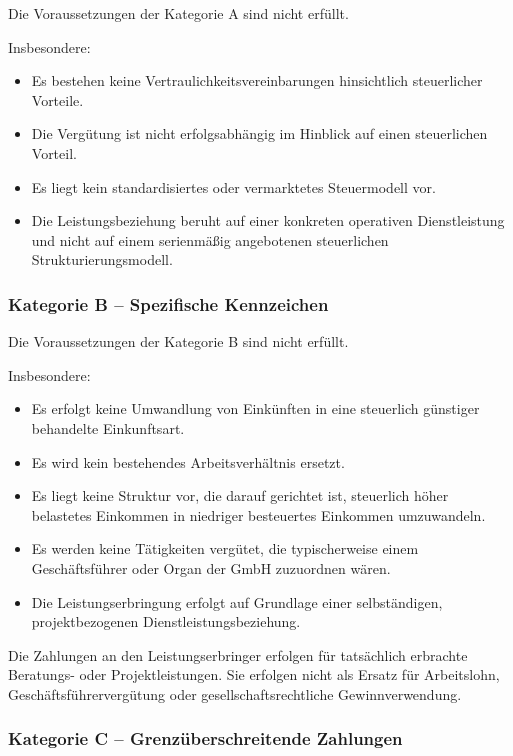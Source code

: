 \documentclass[11pt,a4paper]{article}
\begin{document}
Die Voraussetzungen der Kategorie A sind nicht erfüllt.

Insbesondere:

\begin{itemize}
    \item Es bestehen keine Vertraulichkeitsvereinbarungen hinsichtlich steuerlicher Vorteile.
    \item Die Vergütung ist nicht erfolgsabhängig im Hinblick auf einen steuerlichen Vorteil.
    \item Es liegt kein standardisiertes oder vermarktetes Steuermodell vor.
    \item Die Leistungsbeziehung beruht auf einer konkreten operativen Dienstleistung und nicht auf einem serienmäßig angebotenen steuerlichen Strukturierungsmodell.
\end{itemize}

\subsubsection*{Kategorie B -- Spezifische Kennzeichen}

Die Voraussetzungen der Kategorie B sind nicht erfüllt.

Insbesondere:

\begin{itemize}
    \item Es erfolgt keine Umwandlung von Einkünften in eine steuerlich günstiger behandelte Einkunftsart.
    \item Es wird kein bestehendes Arbeitsverhältnis ersetzt.
    \item Es liegt keine Struktur vor, die darauf gerichtet ist, steuerlich höher belastetes Einkommen in niedriger besteuertes Einkommen umzuwandeln.
    \item Es werden keine Tätigkeiten vergütet, die typischerweise einem Geschäftsführer oder Organ der GmbH zuzuordnen wären.
    \item Die Leistungserbringung erfolgt auf Grundlage einer selbständigen, projektbezogenen Dienstleistungsbeziehung.
\end{itemize}

Die Zahlungen an den Leistungserbringer erfolgen für tatsächlich erbrachte Beratungs- oder Projektleistungen. Sie erfolgen nicht als Ersatz für Arbeitslohn, Geschäftsführervergütung oder gesellschaftsrechtliche Gewinnverwendung.

\subsubsection*{Kategorie C -- Grenzüberschreitende Zahlungen}
\end{document}

